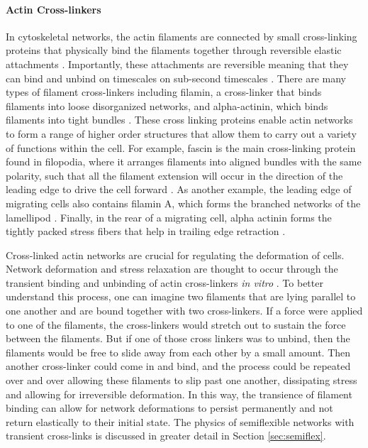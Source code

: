 \paragraph{Actin Cross-linkers}  In cytoskeletal networks, the actin filaments are connected by small cross-linking proteins that physically bind the filaments together through reversible elastic attachments \cite{B912163N}. Importantly, these attachments are reversible meaning that they can bind and unbind on timescales on sub-second timescales \cite{B912163N}.  There are many types of filament cross-linkers including filamin, a cross-linker that  binds filaments into loose disorganized networks, and  alpha-actinin, which  binds filaments into tight bundles \cite{B912163N}.   These cross linking proteins enable actin networks to form a range of higher order structures that allow them to carry out a variety of functions within the cell.  For example, fascin is the main cross-linking protein found in filopodia, where it arranges filaments into aligned bundles with the same polarity, such that all the filament extension will occur in the direction of the leading edge to drive the cell forward \cite{Ross2000658}. As another example, the leading edge of migrating cells also contains filamin A, which forms the branched networks of the lamellipod \cite{Cunningham325}. Finally, in the rear of a migrating cell, alpha actinin forms the tightly packed stress fibers that help in trailing edge retraction \cite{Zaidel-Bar2007}.  

Cross-linked actin networks are crucial for regulating the deformation of cells.  Network deformation and stress relaxation are thought to occur through the transient binding and unbinding of actin cross-linkers\cite{Ahmed26052015} \textit{in vitro} \cite{PhysRevLett.101.108101}.  To better understand this process, one can imagine two filaments that are lying parallel to one another and are bound together with two cross-linkers.  If a force were applied to one of the filaments, the cross-linkers would stretch out to sustain the force between the filaments.  But if one of those cross linkers was to unbind, then the filaments would be free to slide away from each other by a small amount.  Then another cross-linker could come in and bind, and the process could be repeated over and over allowing these filaments to slip past one another, dissipating stress and allowing for irreversible deformation.  In this way, the transience of filament binding can allow for network deformations to persist permanently and not return elastically to their initial state.  The physics of semiflexible networks with transient cross-links is discussed in greater detail in Section \ref{sec:semiflex}.


